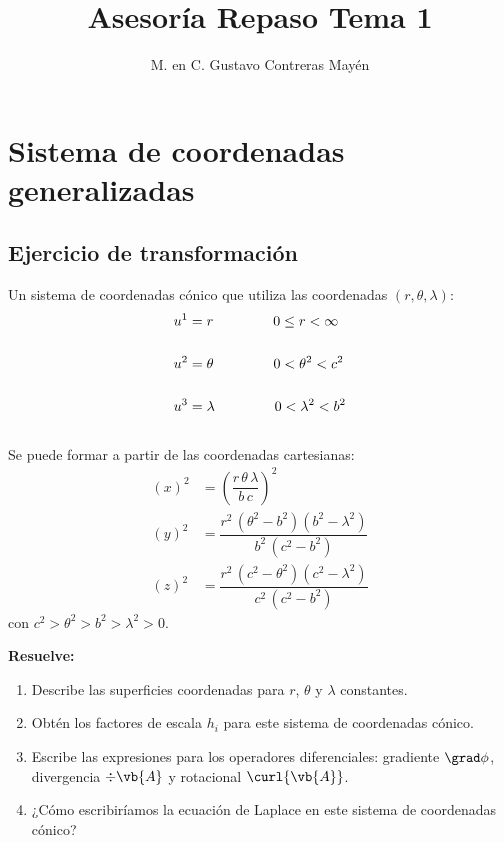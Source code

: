 
\title{\large{Asesoría Repaso Tema 1} \vspace{-3ex}}
\author{M. en C. Gustavo Contreras Mayén}
\date{ }
\newcommand{\Cancel}[2][black]{{\color{#1}\cancel{\color{black}#2}}}

\vspace{-4cm}
\maketitle
\fontsize{14}{14}\selectfont
\tableofcontents
\newpage

\section{Sistema de coordenadas generalizadas}
\subsection{Ejercicio de transformación}

Un sistema de coordenadas cónico que utiliza las coordenadas $(r, \theta, \lambda)$:
\begin{align*}
u^{1} &= r \hspace{1.5cm} 0 \leq r < \infty \\[0.5cm]
u^{2} &= \theta \hspace{1.5cm} 0 < \theta^{2} < c^{2} \\[0.5cm]
u^{3} &= \lambda \hspace{1.5cm} 0 < \lambda^{2} < b^{2} \\[0.5cm]
\end{align*}
Se puede formar a partir de las coordenadas cartesianas:
\begin{align*}
(x)^{2} &= \left( \dfrac{r \, \theta \, \lambda}{b \, c} \right)^{2} \\[0.5em]
(y)^{2} &= \dfrac{r^{2} \, (\theta^{2} - b^{2})(b^{2} - \lambda^{2})}{b^{2} \, (c^{2} - b^{2})} \\[0.5em]
(z)^{2} &= \dfrac{r^{2} \, (c^{2} - \theta^{2})(c^{2} - \lambda^{2})}{c^{2} \, (c^{2} - b^{2})}
\end{align*}
con $c^{2} > \theta^{2} > b^{2} > \lambda^{2} > 0$.

\textbf{Resuelve:}

\begin{enumerate}
\item Describe las superficies coordenadas para $r$, $\theta$ y $\lambda$ constantes.
\item Obtén los factores de escala $h_{i}$ para este sistema de coordenadas cónico.
\item Escribe las expresiones para los operadores diferenciales: gradiente $\grad \phi$, divergencia $\div{\vb{A}}$ y rotacional $\curl{\vb{A}}$.
\item ¿Cómo escribiríamos la ecuación de Laplace en este sistema de coordenadas cónico?
\end{enumerate}

